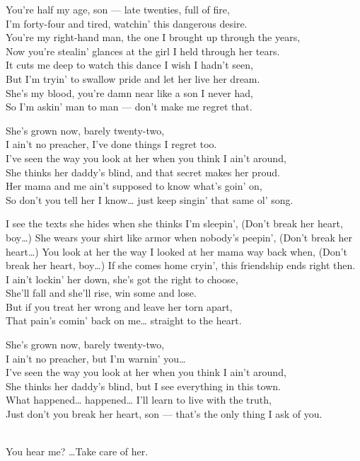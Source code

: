 \begin{lyrics}
You’re half my age, son — late twenties, full of fire,\\
I’m forty-four and tired, watchin’ this dangerous desire.\\
You’re my right-hand man, the one I brought up through the years,\\
Now you’re stealin’ glances at the girl I held through her tears.\\
It cuts me deep to watch this dance I wish I hadn’t seen,\\
But I’m tryin’ to swallow pride and let her live her dream.\\
She’s my blood, you’re damn near like a son I never had,\\
So I’m askin’ man to man — don’t make me regret that.

She’s grown now, barely twenty-two,\\
I ain’t no preacher, I’ve done things I regret too.\\
I’ve seen the way you look at her when you think I ain’t around,\\
She thinks her daddy’s blind, and that secret makes her proud.\\
Her mama and me ain’t supposed to know what’s goin’ on,\\
So don’t you tell her I know… just keep singin’ that same ol’ song.

 I see the texts she hides when she thinks I’m sleepin’,
 (Don’t break her heart, boy…)
 She wears your shirt like armor when nobody’s peepin’,
 (Don’t break her heart…)
 You look at her the way I looked at her mama way back when,
 (Don’t break her heart, boy…)
 If she comes home cryin’, this friendship ends right then.\\
I ain’t lockin’ her down, she’s got the right to choose,\\
She’ll fall and she’ll rise, win some and lose.\\
But if you treat her wrong and leave her torn apart,\\
That pain’s comin’ back on me… straight to the heart.

She’s grown now, barely twenty-two,\\
I ain’t no preacher, but I’m warnin’ you…\\
I’ve seen the way you look at her when you think I ain’t around,\\
She thinks her daddy’s blind, but I see everything in this town.\\
What happened… happened… I’ll learn to live with the truth,\\
Just don’t you break her heart, son — that’s the only thing I ask of you.

\\
You hear me? …Take care of her.

\end{lyrics}

